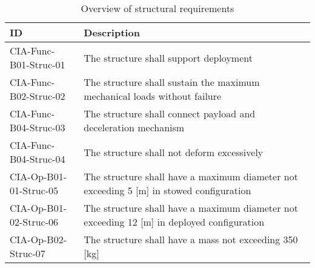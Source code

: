 \begin{table}[H]
	\caption*{Overview of structural requirements}
	\begin{tabular}{|p{}|p{}|}
    \hline
    ID          & Description                                                                                                      \\ \hline \hline
    CIA-Func-B01-Struc-01 & The structure shall support deployment \\ \hline
    CIA-Func-B02-Struc-02 & The structure shall sustain the maximum mechanical loads without failure                           \\ \hline
    CIA-Func-B04-Struc-03 & The structure shall connect payload and deceleration mechanism \\ \hline
    CIA-Func-B04-Struc-04 & The structure shall not deform excessively \\ \hline
    CIA-Op-B01-01-Struc-05 & The structure shall have a maximum diameter not exceeding 5 [m] in stowed configuration                              \\ \hline
    CIA-Op-B01-02-Struc-06 & The structure shall have a maximum diameter not exceeding 12 [m] in deployed configuration     \\ \hline
    CIA-Op-B02-Struc-07 & The structure shall have a mass not exceeding 350 [kg]\\ \hline
    \end{tabular}
    \label{tab:strucfuncrequirements}
\end{table}

